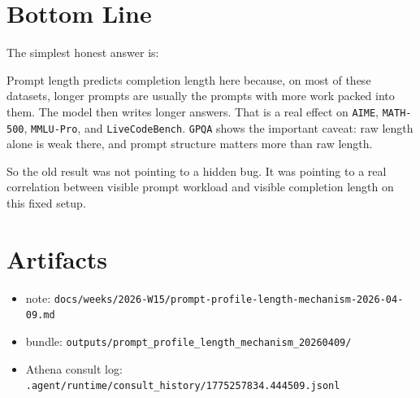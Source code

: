 \documentclass[11pt]{article}
\begin{document}
\section*{Bottom Line}
The simplest honest answer is:

Prompt length predicts completion length here because, on most of these datasets, longer prompts are usually the prompts with more work packed into them. The model then writes longer answers. That is a real effect on \texttt{AIME}, \texttt{MATH-500}, \texttt{MMLU-Pro}, and \texttt{LiveCodeBench}. \texttt{GPQA} shows the important caveat: raw length alone is weak there, and prompt structure matters more than raw length.

So the old result was not pointing to a hidden bug. It was pointing to a real correlation between visible prompt workload and visible completion length on this fixed setup.

\section*{Artifacts}
\begin{itemize}[leftmargin=1.5em]
\item note: \texttt{docs/weeks/2026-W15/prompt-profile-length-mechanism-2026-04-09.md}
\item bundle: \texttt{outputs/prompt\_profile\_length\_mechanism\_20260409/}
\item Athena consult log: \texttt{.agent/runtime/consult\_history/1775257834.444509.jsonl}
\end{itemize}
\end{document}
